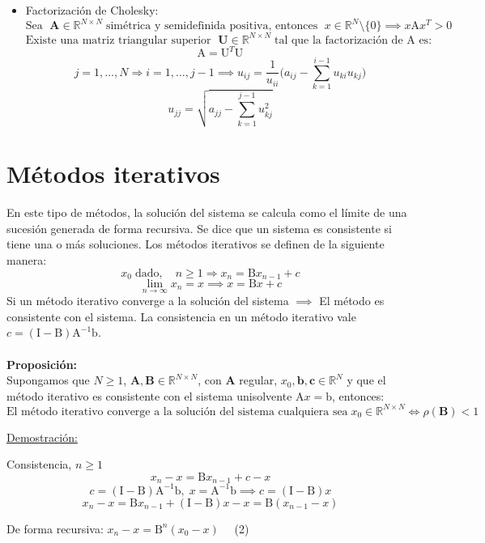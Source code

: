 \documentclass{article}
\begin{document}
\hrulefill

\begin{itemize}
\item Factorización de Cholesky:
$$\text{Sea }\;\textbf{A}\in\mathbb{R}^{N\times N}\;\text{simétrica y semidefinida positiva, entonces }\;x\in\mathbb{R}^N\setminus\{0\}\implies x\text{A}x^T>0$$
$$\text{Existe una matriz triangular superior }\;\textbf{U}\in\mathbb{R}^{N\times N}\;\text{tal que la factorización de A es:}$$
$$\text{A}=\text{U}^T\text{U}$$
$$j=1,\dots,N\Rightarrow i=1,\dots,j-1\implies u_{ij}=\frac{1}{u_{ii}}\bigg(a_{ij}-\sum_{k=1}^{i-1}u_{ki}u_{kj}\bigg)$$
$$u_{jj}=\sqrt{a_{jj}-\sum_{k=1}^{j-1}u_{kj}^2}$$
\end{itemize}
%
%
\section{Métodos iterativos}

En este tipo de métodos, la solución del sistema se calcula como el límite de una sucesión generada de forma recursiva. Se dice que un sistema es consistente si tiene una o más soluciones. Los métodos iterativos se definen de la siguiente manera:
$$x_0\;\text{dado},\quad n\geq 1\Rightarrow x_n=\text{B}x_{n-1}+c$$
$$\lim_{n\to\infty}x_n=x\implies x=\text{B}x+c$$
Si un método iterativo converge a la solución del sistema $\implies$ El método es consistente con el sistema. La consistencia en un método iterativo vale $c=(\text{I}-\text{B})\text{A}^{-1}\text{b}$.
\\
\\
\textbf{Proposición:}
\\
Supongamos que $N\geq 1$, $\textbf{A},\textbf{B}\in\mathbb{R}^{N\times N}$, con \textbf{A} regular, $x_0,\textbf{b},\textbf{c}\in\mathbb{R}^N$ y que el método iterativo es consistente con el sistema unisolvente $\text{A}x=\text{b}$, entonces:
$$\text{El método iterativo converge a la solución del sistema cualquiera sea}\;x_0\in\mathbb{R}^{N\times N}\iff\rho(\textbf{B})<1$$

\hrulefill

\underline{Demostración:}

Consistencia, $n\geq 1$
$$x_n-x=\text{B}x_{n-1}+c-x$$
$$c=(\text{I}-\text{B})\text{A}^{-1}\text{b},\;x=\text{A}^{-1}\text{b}\implies c=(\text{I}-\text{B})x$$
$$x_n-x=\text{B}x_{n-1}+(\text{I}-\text{B})x-x=\text{B}(x_{n-1}-x)$$

De forma recursiva: $x_n-x=\text{B}^n(x_0-x)\quad$ (2)
\end{document}
